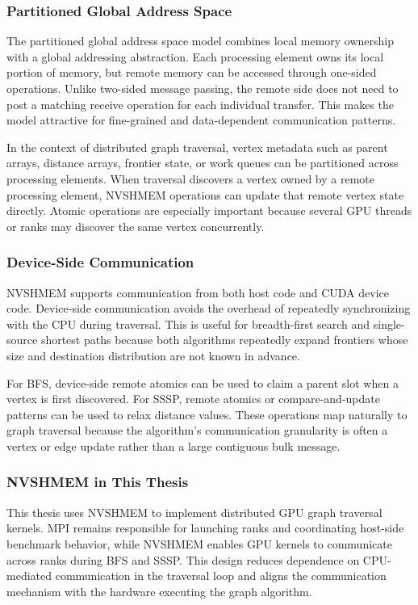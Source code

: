 \documentclass{article}
\begin{document}
\subsubsection*{Partitioned Global Address Space}

The partitioned global address space model combines local memory ownership with a global addressing abstraction. Each processing element owns its local portion of memory, but remote memory can be accessed through one-sided operations. Unlike two-sided message passing, the remote side does not need to post a matching receive operation for each individual transfer. This makes the model attractive for fine-grained and data-dependent communication patterns.

In the context of distributed graph traversal, vertex metadata such as parent arrays, distance arrays, frontier state, or work queues can be partitioned across processing elements. When traversal discovers a vertex owned by a remote processing element, NVSHMEM operations can update that remote vertex state directly. Atomic operations are especially important because several GPU threads or ranks may discover the same vertex concurrently.

\subsubsection*{Device-Side Communication}

NVSHMEM supports communication from both host code and CUDA device code. Device-side communication avoids the overhead of repeatedly synchronizing with the CPU during traversal. This is useful for breadth-first search and single-source shortest paths because both algorithms repeatedly expand frontiers whose size and destination distribution are not known in advance.

For BFS, device-side remote atomics can be used to claim a parent slot when a vertex is first discovered. For SSSP, remote atomics or compare-and-update patterns can be used to relax distance values. These operations map naturally to graph traversal because the algorithm's communication granularity is often a vertex or edge update rather than a large contiguous bulk message.

\subsubsection*{NVSHMEM in This Thesis}

This thesis uses NVSHMEM to implement distributed GPU graph traversal kernels. MPI remains responsible for launching ranks and coordinating host-side benchmark behavior, while NVSHMEM enables GPU kernels to communicate across ranks during BFS and SSSP. This design reduces dependence on CPU-mediated communication in the traversal loop and aligns the communication mechanism with the hardware executing the graph algorithm.
\end{document}
